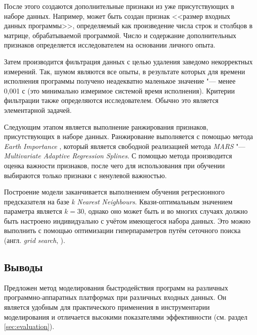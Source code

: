 После этого создаются дополнительные признаки из уже присутствующих в наборе данных. Например, может быть создан признак <<размер входных данных программы>>, определяемый как произведение числа строк и столбцов в матрице, обрабатываемой программой. Число и содержание дополнительных признаков определяется исследователем на основании личного опыта.

Затем производится фильтрация данных с целью удаления заведомо некорректных измерений. Так, шумом являются все опыты, в результате которых для времени исполнения программы получено неадекватно маленькое значение "--- менее 0,001 с (это минимально измеримое системой время исполнения). Критерии фильтрации также определяются исследователем. Обычно это является элементарной задачей.

Следующим этапом является выполнение ранжирования признаков, присутствующих в наборе данных. Ранжирование выполняется с помощью метода \textit{Earth Importance} \cite{earth-importance}, который является свободной реализацией метода \textit{MARS} "--- \textit{Multivariate Adaptive Regression Splines}. С помощью метода производится оценка важности признаков, после чего для использования при обучении выбираются только признаки с ненулевой важностью.

Построение модели заканчивается выполнением обучения регресионного предсказателя на базе \textit{k Nearest Neighbours}. Квази-оптимальным значением параметра является $k = 30$, однако оно может быть и во многих случаях должно быть настроено индивидуально с учётом имеющегося набора данных. Это можно выполнить с помощью оптимизации гиперпараметров путём сеточного поиска (англ. \textit{grid search}, \cite{grid-search}).

\subsection{Выводы}
Предложен метод моделирования быстродействия программ на различных программно-аппаратных платформах при различных входных данных. Он является удобным для практического применения в инструментарии моделирования и отличается высокими показателями эффективности (см. раздел \ref{sec:evaluation}).